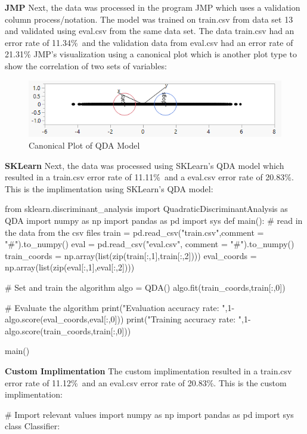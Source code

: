 \documentclass{article}
\begin{document}
\begin{flushleft}
\break
\textbf{JMP}\break
\break
Next, the data was processed in the program JMP which uses a validation column process/notation. The model was trained on train.csv from data set 13 and validated using eval.csv from the same data set. The data train.csv had an error rate of 11.34\%\ and the validation data from eval.csv had an error rate of 21.31\%\break
\break
JMP's visualization using a canonical plot which is another plot type to show the correlation of two sets of variables:\break
\begin{figure}[!htb]
        \centering
        \begin{minipage}{0.49\textwidth}
                \centering
                \includegraphics[width=1\linewidth]{../JMPCanonicalPlot.png}
                \caption{Canonical Plot of QDA Model}
        \end{minipage}
\end{figure}
\pagebreak
\textbf{SKLearn}\break
\break
Next, the data was processed using SKLearn's QDA model which resulted in a train.csv error rate of 11.11\%\ and a eval.csv error rate of 20.83\%.\break
\break
This is the implimentation using SKLearn's QDA model:\break
\begin{python}
from sklearn.discriminant_analysis import QuadraticDiscriminantAnalysis as QDA
import numpy as np
import pandas as pd
import sys
def main():
        # read in the data from the csv files
        train = pd.read_csv("train.csv",comment = "#").to_numpy()
        eval = pd.read_csv("eval.csv", comment = "#").to_numpy()
        train_coords = np.array(list(zip(train[:,1],train[:,2])))
        eval_coords = np.array(list(zip(eval[:,1],eval[:,2])))
        
        # Set and train the algorithm
        algo = QDA()
        algo.fit(train_coords,train[:,0])
        
        # Evaluate the algorithm
        print("Evaluation accuracy rate: ",1-algo.score(eval_coords,eval[:,0]))
        print("Training accuracy rate: ",1-algo.score(train_coords,train[:,0]))
        
        
main()
\end{python}
\textbf{Custom Implimentation}\break
\break
The custom implimentation resulted in a train.csv error rate of 11.12\%\, and an eval.csv error rate of 20.83\%.\break
\break
This is the custom implimentation:\break
\begin{python}
# Import relevant values       
import numpy as np
import pandas as pd
import sys
class Classifier:


\end{python}
\end{flushleft}
\end{document}
